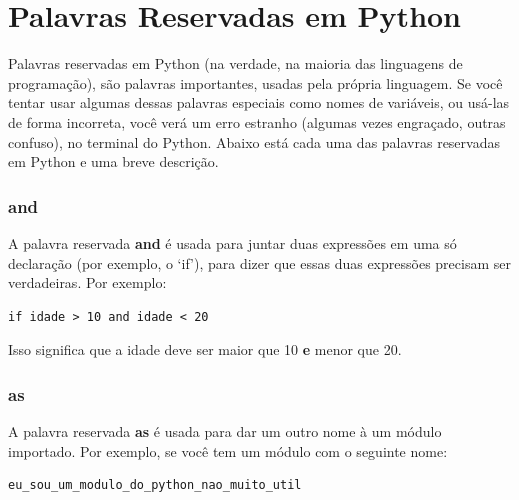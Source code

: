 
\chapter{Palavras Reservadas em Python}\label{app:pythonkeywords}

Palavras reservadas em Python (na verdade, na maioria das linguagens de programação), são palavras importantes, usadas pela própria linguagem. Se você tentar usar algumas dessas palavras especiais como nomes de variáveis, ou usá-las de forma incorreta, você verá um erro estranho (algumas vezes engraçado, outras confuso), no terminal do Python. Abaixo está cada uma das palavras reservadas em Python e uma breve descrição.

\subsection*{and}

A palavra reservada \textbf{and} é usada para juntar duas expressões em uma só declaração (por exemplo, o `if'), para dizer que essas duas expressões precisam ser verdadeiras. Por exemplo:

\begin{listingignore}
\begin{verbatim}
if idade > 10 and idade < 20
\end{verbatim}
\end{listingignore}

\noindent
Isso significa que a idade deve ser maior que 10 \textbf{e} menor que 20.

\subsection*{as}

A palavra reservada \textbf{as} é usada para dar um outro nome à um módulo importado. Por exemplo, se você tem um módulo com o seguinte nome:

\begin{listingignore}
\begin{verbatim}
eu_sou_um_modulo_do_python_nao_muito_util
\end{verbatim}
\end{listingignore}

